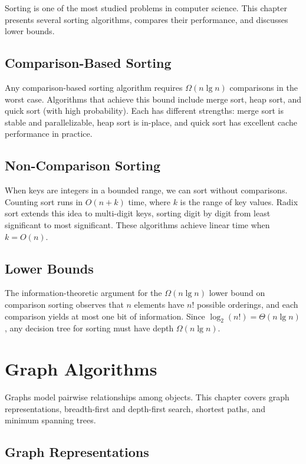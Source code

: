\documentclass[
    language=english,
    doctype=book,
    institution=none,
    titlestyle=book
]{../../omnilatex}
\begin{document}
Sorting is one of the most studied problems in computer science. This chapter presents several sorting algorithms, compares their performance, and discusses lower bounds.

\section{Comparison-Based Sorting}

Any comparison-based sorting algorithm requires $\Omega(n \lg n)$ comparisons in the worst case. Algorithms that achieve this bound include merge sort, heap sort, and quick sort (with high probability). Each has different strengths: merge sort is stable and parallelizable, heap sort is in-place, and quick sort has excellent cache performance in practice.

\section{Non-Comparison Sorting}

When keys are integers in a bounded range, we can sort without comparisons. Counting sort runs in $O(n + k)$ time, where $k$ is the range of key values. Radix sort extends this idea to multi-digit keys, sorting digit by digit from least significant to most significant. These algorithms achieve linear time when $k = O(n)$.

\section{Lower Bounds}

The information-theoretic argument for the $\Omega(n \lg n)$ lower bound on comparison sorting observes that $n$ elements have $n!$ possible orderings, and each comparison yields at most one bit of information. Since $\log_2(n!) = \Theta(n \lg n)$, any decision tree for sorting must have depth $\Omega(n \lg n)$.

\chapter{Graph Algorithms}\label{ch:graphs}

Graphs model pairwise relationships among objects. This chapter covers graph representations, breadth-first and depth-first search, shortest paths, and minimum spanning trees.

\section{Graph Representations}
\end{document}
